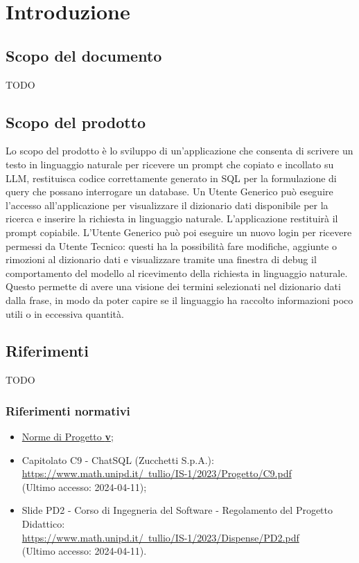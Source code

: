 \section{Introduzione}

\subsection{Scopo del documento}
TODO 
\subsection{Scopo del prodotto}
Lo scopo del prodotto è lo sviluppo di un'applicazione che consenta di scrivere un testo in linguaggio naturale per ricevere un prompt che copiato e incollato su LLM, restituisca codice correttamente generato in SQL per la formulazione di query che possano interrogare un database. 
Un Utente Generico può eseguire l'accesso all'applicazione per visualizzare il dizionario dati disponibile per la ricerca e inserire la richiesta in linguaggio naturale. 
L'applicazione restituirà il prompt copiabile. 
L'Utente Generico può poi eseguire un nuovo login per ricevere permessi da Utente Tecnico: questi ha la possibilità fare modifiche, aggiunte o rimozioni al dizionario dati e visualizzare tramite una finestra di debug il comportamento del modello al ricevimento della richiesta in linguaggio naturale. 
Questo permette di avere una visione dei termini selezionati nel dizionario dati dalla frase, in modo da poter capire se il linguaggio ha raccolto informazioni poco utili o in eccessiva quantità.
\subsection{Riferimenti}
TODO
\subsubsection{Riferimenti normativi}
\begin{itemize}
  \item \href{https://github.com/Argo-swe/Argo-swe.github.io/tree/main/2 - RTB}{Norme di Progetto \textbf{v\VersioneNP}};
  \item Capitolato C9 - ChatSQL (Zucchetti S.p.A.): \\ \href{https://www.math.unipd.it/~tullio/IS-1/2023/Progetto/C9.pdf}{https://www.math.unipd.it/~tullio/IS-1/2023/Progetto/C9.pdf} \\ (Ultimo accesso: 2024-04-11);
  \item Slide PD2 - Corso di Ingegneria del Software - Regolamento del Progetto Didattico: \\ \href{https://www.math.unipd.it/~tullio/IS-1/2023/Dispense/PD2.pdf}{https://www.math.unipd.it/~tullio/IS-1/2023/Dispense/PD2.pdf} \\ (Ultimo accesso: 2024-04-11).
\end{itemize}

